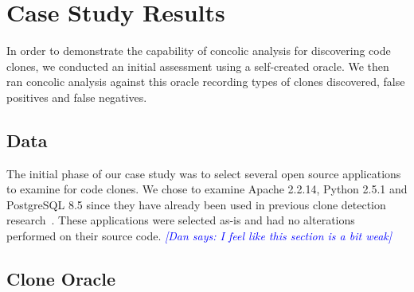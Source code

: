 \documentclass{sig-alternate}
\newcommand{\dan}[1]{\textcolor{blue}{{\it [Dan says: #1]}}}
\begin{document}






\section{Case Study Results}

In order to demonstrate the capability of concolic analysis for discovering code clones, we conducted an initial assessment using a self-created oracle. We then ran concolic analysis against this oracle recording types of clones discovered, false positives and false negatives. 



\subsection{Data}

The initial phase of our case study was to select several open source applications to examine for code clones. We chose to examine Apache 2.2.14, Python 2.5.1 and PostgreSQL 8.5 since they have already been used in previous clone detection research~\cite{Kim:2011:MMC:1985793.1985835}. These applications were selected as-is and had no alterations performed on their source code.
\dan{I feel like this section is a bit weak}



\subsection{Clone Oracle}
\end{document}
